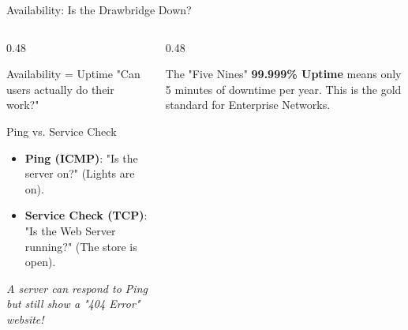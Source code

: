 \documentclass[aspectratio=169]{beamer}  %
\begin{document}
\begin{frame}{Availability: Is the Drawbridge Down?}
    \begin{columns}[T]
        \begin{column}{0.48\textwidth}
            \begin{block}{Availability = Uptime}
                \footnotesize
                "Can users actually do their work?"
            \end{block}
            \begin{alertblock}{Ping vs. Service Check}
                \footnotesize
                \begin{itemize}
                    \item \textbf{Ping (ICMP)}: "Is the server on?" (Lights are on).
                    \item \textbf{Service Check (TCP)}: "Is the Web Server running?" (The store is open).
                \end{itemize}
                \textit{A server can respond to Ping but still show a "404 Error" website!}
            \end{alertblock}
        \end{column}
        \begin{column}{0.48\textwidth}
            \begin{center}
            \end{center}
            \begin{block}{The "Five Nines"}
                \footnotesize
                \textbf{99.999\% Uptime} means only 5 minutes of downtime per year. This is the gold standard for Enterprise Networks.
            \end{block}
        \end{column}
    \end{columns}
\end{frame}
\end{document}
